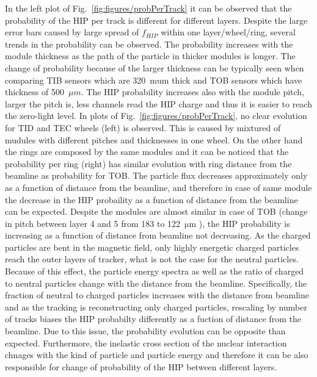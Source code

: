 In the left plot of Fig.~\ref{fig:figures/probPerTrack} it can be observed that the probability of the HIP per track is different for different layers. Despite the large error bars caused by large spread of $f_{HIP}$ within one layer/wheel/ring, several trends in the probability can be observed. The probability increases with the module thickness as the path of the particle in thicker modules is longer. The change of probability because of the larger thickness can be typically seen when comparing TIB sensors which are 320~$\mathrm{mu m}$ thick and TOB sensors which have thickness of 500~$\mu m$. The HIP probability increases also with the module pitch, larger the pitch is, less channels read the HIP charge and thus it is easier to reach the zero-light level. In plots of Fig.~\ref{fig:figures/probPerTrack}, no clear evolution for TID and TEC wheels (left) is observed. This is caused by mixtured of mudules with different pitches and thicknesses in one wheel. On the other hand the rings are composed by the same modules and it can be noticed that the probability per ring (right) has similar evolution with ring distance from the beamline as probability for TOB. The particle flux decreases approximately only as a function of distance from the beamline, and therefore in case of same module the decrease in the HIP probaility as a function of distance from the beamline can be expected. Despite the modules are almost similar in case of TOB (change in pitch between layer 4 and 5 from 183 to 122~$\mathrm{\mu m}$ ), the HIP probability is increasing as a function of distance from beamline not decreasing. As the charged particles are bent in the magnetic field, only highly energetic charged particles reach the outer layers of tracker, what is not the case for the neutral particles. Because of this effect, the particle energy spectra as well as the ratio of charged to neutral particles change with the distance from the beamline. Specifically, the fraction of neutral to charged particles increases with the distance from beamline and as the tracking is reconstructing only charged particles, rescaling by number of tracks biases the HIP probabilty differently as a fuction of distance from the beamline. Due to this issue, the probability evolution can be opposite than expected. Furthermore, the inelastic cross section of the nuclear interaction chnages with the kind of particle and particle energy and therefore it can be also responsible for change of probability of the HIP between different layers.  


